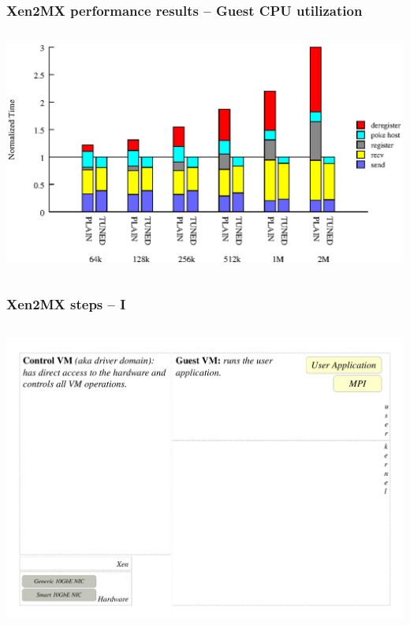 \documentclass[red,slidestop,notes,compress,mathserif]{beamer}
\begin{document}
\begin{frame}
\frametitle{Xen2MX performance results -- Guest CPU utilization}
\begin{columns}
\includegraphics[width=\textwidth]{figs/bare/lat_breakdown_domU.eps}
\end{columns}
\end{frame}

\begin{frame}
\frametitle{Xen2MX steps -- I}
\begin{columns}
\includegraphics[width=\textwidth]{figs/bare/xen2mx_step1.pdf}
\end{columns}
\end{frame}
\end{document}
